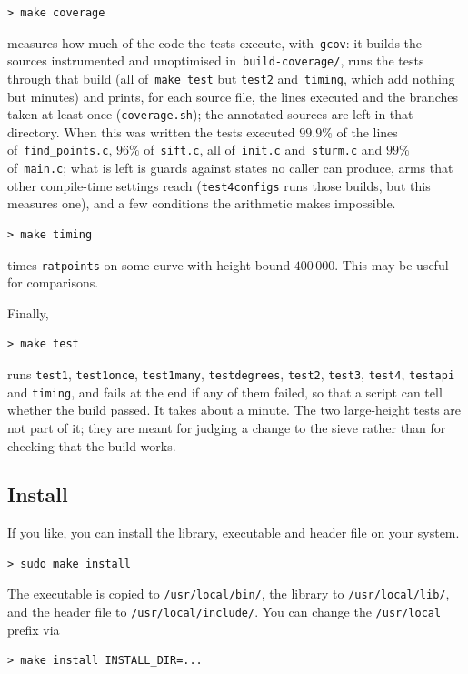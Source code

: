 \documentclass[12pt,a4paper,oneside]{amsart}
\begin{document}
\begin{verbatim}
> make coverage
\end{verbatim}
measures how much of the code the tests execute, with~\texttt{gcov}: it
builds the sources instrumented and unoptimised in~\texttt{build-coverage/},
runs the tests through that build (all of~\texttt{make test} but \texttt{test2}
and~\texttt{timing}, which add nothing but minutes) and prints,
for each source file, the lines executed
and the branches taken at least once (\texttt{coverage.sh}); the
annotated sources are left in that directory.
When this was written the tests executed $99.9\%$ of the lines
of~\texttt{find\_points.c}, $96\%$ of~\texttt{sift.c}, all of~\texttt{init.c}
and~\texttt{sturm.c} and $99\%$ of~\texttt{main.c}; what is left is guards
against states no caller can produce, arms that other compile-time settings
reach (\texttt{test4configs} runs those builds, but this measures one), and
a few conditions the arithmetic makes impossible.

\begin{verbatim}
> make timing
\end{verbatim}
times \texttt{ratpoints} on some curve with height bound $400\,000$.
This may be useful for comparisons.

Finally,
\begin{verbatim}
> make test
\end{verbatim}
runs \texttt{test1}, \texttt{test1once}, \texttt{test1many},
\texttt{testdegrees}, \texttt{test2}, \texttt{test3}, \texttt{test4},
\texttt{testapi} and \texttt{timing},
and fails at the end if any of them failed, so that a script can
tell whether the build passed. It takes about a minute.
The two large-height tests are not part of it; they are meant for judging a
change to the sieve rather than for checking that the build works.

\subsection{Install}

If you like, you can install the library, executable and header file
on your system.

\begin{verbatim}
> sudo make install
\end{verbatim}

The executable is copied to \texttt{/usr/local/bin/}, the
library to \texttt{/usr/local/lib/}, and the header file to
\texttt{/usr/local/include/}. You can change the \texttt{/usr/local} prefix
via
\begin{verbatim}
> make install INSTALL_DIR=...
\end{verbatim}
\end{document}
